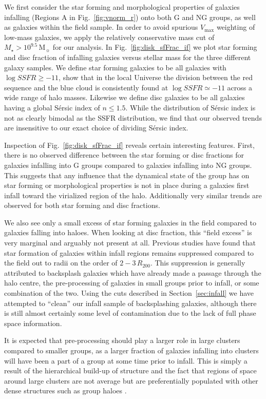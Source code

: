 \documentclass[a4paper,fleqn,usenatbib]{mnras}
\newcommand{\Msun}{\,\mathrm{M_{\sun}}}
\begin{document}
We first consider the star forming and morphological properties of
galaxies infalling (Regions A in Fig.~\ref{fig:vnorm_r}) onto both G
and NG groups, as well as galaxies within the field sample.  In order
to avoid spurious $V_\mathrm{max}$ weighting of low-mass galaxies, we
apply the relatively conservative mass cut of $M_\star >
10^{9.5}\Msun$ for our analysis.  In
Fig.~\ref{fig:disk_sfFrac_if} we plot star forming and disc fraction
of infalling galaxies
versus stellar mass for the three different galaxy samples.  We define
star forming galaxies to be all galaxies with $\log SSFR \ge -11$,
\citet{wetzel2012} show that in the local Universe the division
between the red sequence and the blue cloud is consistently found at
$\log SSFR \simeq -11$ across a wide range of halo masses.  Likewise
we define disc galaxies to be all galaxies having a global S\'{e}rsic
index of $n \le 1.5$.  While the distribution of S\'{e}rsic index is
not as clearly bimodal as the SSFR distribution, we find that our
observed trends are insensitive to our exact choice of dividing S\'{e}rsic
index.
\par
Inspection of Fig.~\ref{fig:disk_sfFrac_if} reveals certain
interesting features.  First, there is no observed difference
between the star forming or disc fractions for galaxies infalling into
G groups compared to galaxies infalling into NG
groups.  This suggests that any influence that the dynamical state
of the group
has on star forming or morphological properties is not in place during
a galaxies first infall toward the virialized region of the halo.
Additionally very similar trends are observed for both star forming and
disc fractions.
\par
We also see only a small excess of star forming galaxies in the field
compared to galaxies falling into haloes.  When looking at disc fraction, this
``field excess'' is very marginal and arguably not present at all.
Previous studies \citep{lewis2002, gray2004, rines2005, verdugo2008}
have found that star formation of galaxies within infall regions
remains suppressed compared to the field out to radii on the order of
$2-3\,R_{200}$.  This suppression is generally attributed to
backsplash galaxies which have already made a passage through the halo
centre, the pre-processing of galaxies in small groups prior to
infall, or some combination of the two.  Using the cuts described in
Section~\ref{sec:infall} we have attempted to ``clean'' our infall sample
of backsplashing galaxies, although there is still almost certainly
some level of contamination due to the lack of full phase space information.
\par
It is expected that pre-processing
should play a larger role in large clusters compared to smaller
groups, as a larger fraction of galaxies infalling into clusters will
have been a part of a group at some time prior to infall.  This is
simply a result of the hierarchical build-up of structure and the
fact that regions of space around large clusters are not average but
are preferentially populated with other dense structures such as group
haloes \citep[e.g.][]{mo1996, wang2008}.
\end{document}
